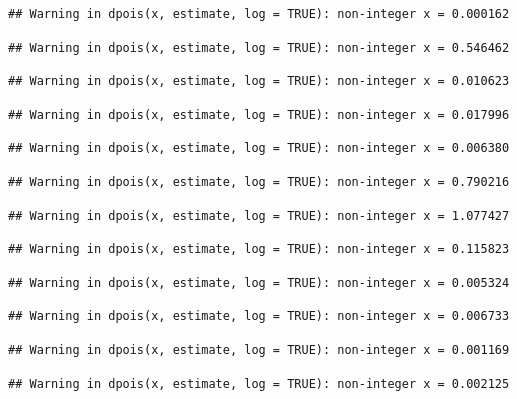 \documentclass[]{article}
\begin{document}
\begin{verbatim}
## Warning in dpois(x, estimate, log = TRUE): non-integer x = 0.000162
\end{verbatim}

\begin{verbatim}
## Warning in dpois(x, estimate, log = TRUE): non-integer x = 0.546462
\end{verbatim}

\begin{verbatim}
## Warning in dpois(x, estimate, log = TRUE): non-integer x = 0.010623
\end{verbatim}

\begin{verbatim}
## Warning in dpois(x, estimate, log = TRUE): non-integer x = 0.017996
\end{verbatim}

\begin{verbatim}
## Warning in dpois(x, estimate, log = TRUE): non-integer x = 0.006380
\end{verbatim}

\begin{verbatim}
## Warning in dpois(x, estimate, log = TRUE): non-integer x = 0.790216
\end{verbatim}

\begin{verbatim}
## Warning in dpois(x, estimate, log = TRUE): non-integer x = 1.077427
\end{verbatim}

\begin{verbatim}
## Warning in dpois(x, estimate, log = TRUE): non-integer x = 0.115823
\end{verbatim}

\begin{verbatim}
## Warning in dpois(x, estimate, log = TRUE): non-integer x = 0.005324
\end{verbatim}

\begin{verbatim}
## Warning in dpois(x, estimate, log = TRUE): non-integer x = 0.006733
\end{verbatim}

\begin{verbatim}
## Warning in dpois(x, estimate, log = TRUE): non-integer x = 0.001169
\end{verbatim}

\begin{verbatim}
## Warning in dpois(x, estimate, log = TRUE): non-integer x = 0.002125
\end{verbatim}
\end{document}
